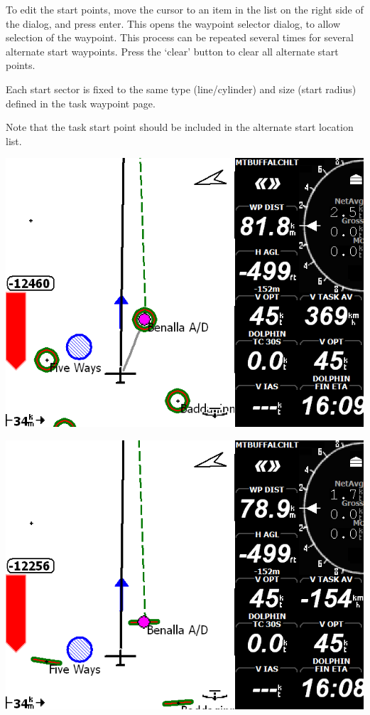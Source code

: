 \documentclass[a4paper,12pt]{refrep}
\begin{document}
  To edit the start points, move the cursor to an item in the list on
  the right side of the dialog, and press enter.  This opens the
  waypoint selector dialog, to allow selection of the waypoint.  This
  process can be repeated several times for several alternate start
  waypoints.  Press the `clear' button to clear all alternate start
  points.

  Each start sector is fixed to the same type (line/cylinder) and size
  (start radius) defined in the task waypoint page.

  Note that the task start point should be included in the alternate
  start location list. 

\begin{center}
\includegraphics[angle=0,width=\linewidth,keepaspectratio='true']{figures/dialog-startpoint3.png}
\end{center}

\begin{center}
\includegraphics[angle=0,width=\linewidth,keepaspectratio='true']{figures/dialog-startpoint4.png}
\end{center}
\end{document}
